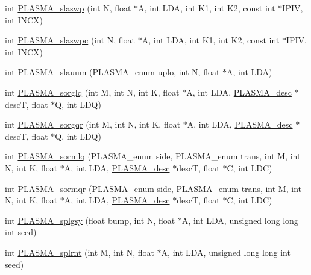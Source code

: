 \begin{DoxyCompactItemize}
int \hyperlink{group__float_gaa20663314d5fd0c31c8a8a2fd6efc7e5_gaa20663314d5fd0c31c8a8a2fd6efc7e5}{P\+L\+A\+S\+M\+A\+\_\+slaswp} (int N, float $\ast$A, int L\+D\+A, int K1, int K2, const int $\ast$I\+P\+I\+V, int I\+N\+C\+X)
\item 
int \hyperlink{group__float_ga044b505b0a887de1be5636328ebe60ab_ga044b505b0a887de1be5636328ebe60ab}{P\+L\+A\+S\+M\+A\+\_\+slaswpc} (int N, float $\ast$A, int L\+D\+A, int K1, int K2, const int $\ast$I\+P\+I\+V, int I\+N\+C\+X)
\item 
int \hyperlink{group__float_gaafb49f230a9c4dbdc635144f46f680f6_gaafb49f230a9c4dbdc635144f46f680f6}{P\+L\+A\+S\+M\+A\+\_\+slauum} (P\+L\+A\+S\+M\+A\+\_\+enum uplo, int N, float $\ast$A, int L\+D\+A)
\item 
int \hyperlink{group__float_ga2f8b6c06f4346761e024c9fa00427a61_ga2f8b6c06f4346761e024c9fa00427a61}{P\+L\+A\+S\+M\+A\+\_\+sorglq} (int M, int N, int K, float $\ast$A, int L\+D\+A, \hyperlink{structplasma__desc__t}{P\+L\+A\+S\+M\+A\+\_\+desc} $\ast$desc\+T, float $\ast$Q, int L\+D\+Q)
\item 
int \hyperlink{group__float_ga4b6a6aa9e5da7961424f3afb62a69562_ga4b6a6aa9e5da7961424f3afb62a69562}{P\+L\+A\+S\+M\+A\+\_\+sorgqr} (int M, int N, int K, float $\ast$A, int L\+D\+A, \hyperlink{structplasma__desc__t}{P\+L\+A\+S\+M\+A\+\_\+desc} $\ast$desc\+T, float $\ast$Q, int L\+D\+Q)
\item 
int \hyperlink{group__float_ga4f42eb41e34bdf290b36fe5ce8e576b7_ga4f42eb41e34bdf290b36fe5ce8e576b7}{P\+L\+A\+S\+M\+A\+\_\+sormlq} (P\+L\+A\+S\+M\+A\+\_\+enum side, P\+L\+A\+S\+M\+A\+\_\+enum trans, int M, int N, int K, float $\ast$A, int L\+D\+A, \hyperlink{structplasma__desc__t}{P\+L\+A\+S\+M\+A\+\_\+desc} $\ast$desc\+T, float $\ast$C, int L\+D\+C)
\item 
int \hyperlink{group__float_ga3d2c263d860db4a6d63fd13156262bd2_ga3d2c263d860db4a6d63fd13156262bd2}{P\+L\+A\+S\+M\+A\+\_\+sormqr} (P\+L\+A\+S\+M\+A\+\_\+enum side, P\+L\+A\+S\+M\+A\+\_\+enum trans, int M, int N, int K, float $\ast$A, int L\+D\+A, \hyperlink{structplasma__desc__t}{P\+L\+A\+S\+M\+A\+\_\+desc} $\ast$desc\+T, float $\ast$C, int L\+D\+C)
\item 
int \hyperlink{group__float_ga949e065a6843e3d20ebc74741ccec2e2_ga949e065a6843e3d20ebc74741ccec2e2}{P\+L\+A\+S\+M\+A\+\_\+splgsy} (float bump, int N, float $\ast$A, int L\+D\+A, unsigned long long int seed)
\item 
int \hyperlink{group__float_ga1ab9b8f017c16245b0f44ab6f4798dfd_ga1ab9b8f017c16245b0f44ab6f4798dfd}{P\+L\+A\+S\+M\+A\+\_\+splrnt} (int M, int N, float $\ast$A, int L\+D\+A, unsigned long long int seed)

\end{DoxyCompactItemize}
